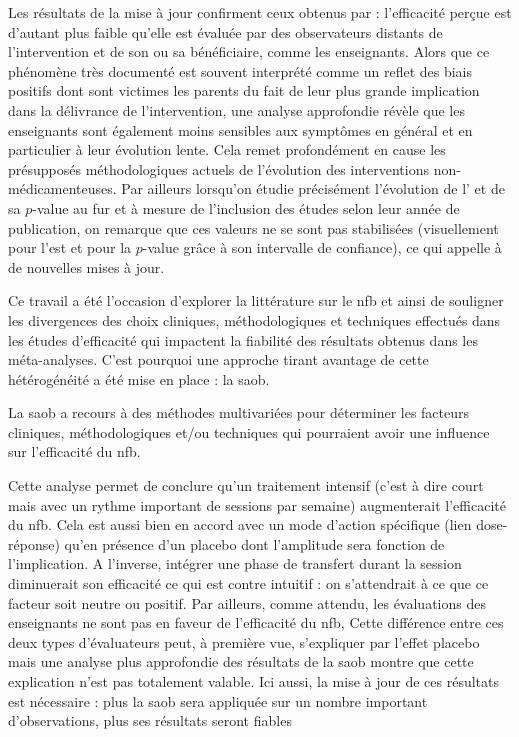 Les résultats de la mise à jour confirment ceux obtenus par \citet{Cortese2016} : 
l'efficacité perçue est d'autant plus faible qu'elle est évaluée par 
des observateurs distants de l'intervention et de son ou sa bénéficiaire, comme les enseignants. Alors que ce phénomène très documenté est souvent 
interprété comme un reflet des biais positifs dont sont victimes les parents du fait de leur plus grande implication dans la délivrance de 
l'intervention, une analyse approfondie révèle que les enseignants sont également moins sensibles aux symptômes en général et en particulier 
à leur évolution lente. 
Cela remet profondément en cause les présupposés méthodologiques actuels de l'évolution des interventions non-médicamenteuses. Par ailleurs
lorsqu'on étudie précisément l'évolution de l' et de sa $p$-value au fur et à mesure de l'inclusion des études selon leur année de publication, 
on remarque que ces valeurs ne se sont pas stabilisées (visuellement pour l'\gls{est} et pour la $p$-value grâce à son intervalle de confiance), 
ce qui appelle à de nouvelles mises à jour.

Ce travail a été l'occasion d'explorer 
la littérature sur le \gls{nfb} et ainsi de souligner les divergences des choix cliniques, méthodologiques et techniques effectués dans les études 
d'efficacité qui impactent la fiabilité
des résultats obtenus dans les méta-analyses. C'est pourquoi une approche tirant avantage de cette hétérogénéité a été mise en place : la \gls{saob}.

La \gls{saob} a recours à des méthodes multivariées pour déterminer les facteurs cliniques, méthodologiques et/ou techniques qui pourraient avoir une 
influence sur l'efficacité du \gls{nfb}. 

Cette analyse permet de conclure qu'un traitement intensif (c'est à dire court mais avec un rythme important de sessions par semaine) augmenterait 
l'efficacité du \gls{nfb}. Cela est aussi bien en accord avec un mode d'action spécifique (lien dose-réponse) qu'en présence d'un placebo dont l'amplitude 
sera fonction de l'implication. A l'inverse,  
intégrer une phase de transfert durant la session diminuerait son efficacité ce qui est contre intuitif : on s'attendrait à ce que ce facteur 
soit neutre ou positif. Par ailleurs, comme attendu, les évaluations des enseignants ne sont pas en faveur de l'efficacité du \gls{nfb},
Cette différence entre ces deux types d'évaluateurs peut, à première vue, s'expliquer par l'effet placebo mais une analyse plus approfondie des 
résultats de la \gls{saob} montre que cette explication n'est pas totalement valable. 
Ici aussi, la mise à jour de ces résultats est nécessaire : plus la \gls{saob} sera appliquée sur un nombre important d'observations,
plus ses résultats seront fiables

